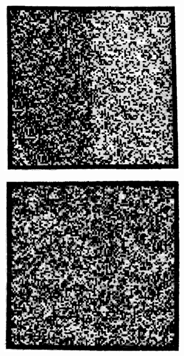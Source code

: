 \begin{figure}[ht]
    \centering
    \begin{subfigure}[b]{0.3\textwidth}
        \centering
        \includegraphics[width=\textwidth]{images/02-julesz-1st_order_compressed.jpg}
        \caption{}
    \end{subfigure}
    \hfill
    \begin{subfigure}[b]{0.29\textwidth}
        \centering
        \includegraphics[width=\textwidth]{images/02-julesz-2nd_order_compressed.jpg}

\end{subfigure}
\end{figure}
